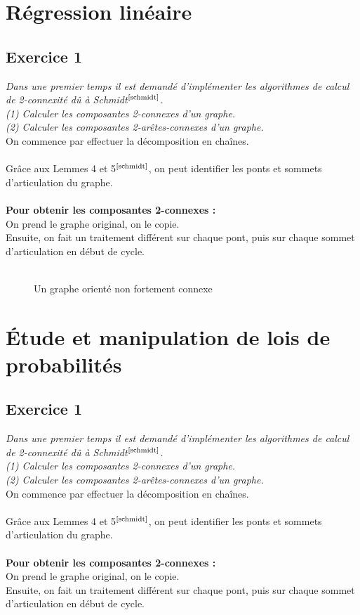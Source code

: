 \documentclass{article}      %
\begin{document}
\section{Régression linéaire}
\subsection{Exercice 1}
\textit{\textcolor{exogris}{
Dans une premier temps il est demandé d’implémenter les algorithmes de calcul de 2-connexité dû à Schmidt$^\text{\cite{schmidt}}$.
\\(1) Calculer les composantes 2-connexes d’un graphe.
\\(2) Calculer les composantes 2-arêtes-connexes d’un graphe.
}}
\\On commence par effectuer la décomposition en chaînes.
\\\\Grâce aux Lemmes 4 et 5$^\text{\cite{schmidt}}$, on peut identifier les ponts et sommets d'articulation du graphe.
\\\\\textbf{Pour obtenir les composantes 2-connexes :}
\\On prend le graphe original, on le copie.
\\Ensuite, on fait un traitement différent sur chaque pont, puis sur chaque sommet d'articulation en début de cycle.


\begin{figure}[H]
    \centering
    \\Un graphe orienté non fortement connexe
\end{figure}


\section{Étude et manipulation de lois de probabilités}
\subsection{Exercice 1}
\textit{\textcolor{exogris}{
Dans une premier temps il est demandé d’implémenter les algorithmes de calcul de 2-connexité dû à Schmidt$^\text{\cite{schmidt}}$.
\\(1) Calculer les composantes 2-connexes d’un graphe.
\\(2) Calculer les composantes 2-arêtes-connexes d’un graphe.
}}
\\On commence par effectuer la décomposition en chaînes.
\\\\Grâce aux Lemmes 4 et 5$^\text{\cite{schmidt}}$, on peut identifier les ponts et sommets d'articulation du graphe.
\\\\\textbf{Pour obtenir les composantes 2-connexes :}
\\On prend le graphe original, on le copie.
\\Ensuite, on fait un traitement différent sur chaque pont, puis sur chaque sommet d'articulation en début de cycle.
\end{document}
